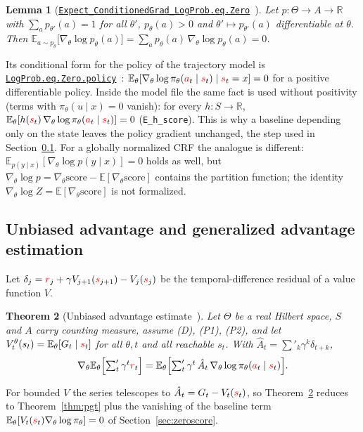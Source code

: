 \documentclass[11pt,a4paper]{article}
\newcommand{\lmod}[2]{\href{http://www.lemma.cn/lean/?module=#2}{\nolinkurl{#1}}}
\newtheorem{theorem}{Theorem}[section]
\newtheorem{lemma}[theorem]{Lemma}
\newcommand{\R}{\mathbb{R}}
\newcommand{\E}{\mathbb{E}}
\newcommand{\rv}[1]{{\color{red}#1}}       %
\newcommand{\sv}{\rv{s}}
\newcommand{\av}{\rv{a}}
\newcommand{\rw}{\rv{r}}
\newcommand{\grad}{\nabla_{\theta}}
\newcommand{\tsum}{\textstyle\sum'}
\begin{document}
\begin{lemma}[\lmod{Expect_ConditionedGrad_LogProb.eq.Zero}{Random.ExpectConditionedGrad_LogProb.eq.Zero}~\cite{lemma_zero}]
\label{lem:zero}
Let $p:\Theta\to A\to\R$ with $\sum_ap_{\theta'}(a)=1$ for all $\theta'$, $p_\theta(a)>0$ and $\theta'\mapsto p_{\theta'}(a)$ differentiable at $\theta$.
Then $\displaystyle\E_{a\sim p_\theta}\bigl[\grad\log p_\theta(a)\bigr]=\sum_ap_\theta(a)\,\grad\log p_\theta(a)=0$.
\end{lemma}
Its conditional form for the policy of the trajectory model is \lmod{LogProb.eq.Zero.policy}{Random.ExpectConditionedGrad_LogProb.eq.Zero#policy}~\cite{lemma_score}: $\E_\theta[\grad\log\pi_\theta(\av_t\mid\sv_t)\mid\sv_t=x]=0$ for a positive differentiable policy.
Inside the model file the same fact is used without positivity (terms with $\pi_\theta(u\mid x)=0$ vanish): for every $h:S\to\R$, $\E_\theta[h(\sv_t)\,\grad\log\pi_\theta(\av_t\mid\sv_t)]=0$ (\texttt{E\_h\_score}).
This is why a baseline depending only on the state leaves the policy gradient unchanged, the step used in Section~\ref{sec:gae}.
For a globally normalized CRF the analogue is different: $\E_{p(y\mid x)}[\grad\log p(y\mid x)]=0$ holds as well, but $\grad\log p=\grad\mathrm{score}-\E[\grad\mathrm{score}]$ contains the partition function; the identity $\grad\log Z=\E[\grad\mathrm{score}]$ is not formalized.


\subsection{Unbiased advantage and generalized advantage estimation}
\label{sec:gae}

Let $\delta_j=\rw_j+\gamma V_{j+1}(\sv_{j+1})-V_j(\sv_j)$ be the temporal-difference residual of a value function $V$.

\begin{theorem}[Unbiased advantage estimate~\cite{lemma_uae}]
\label{thm:main}
Let $\Theta$ be a real Hilbert space, $S$ and $A$ carry counting measure, assume (D), (P1), (P2), and let $V^\theta_t(s_t)=\E_\theta[G_t\mid\sv_t]$ for all $\theta,t$ and all reachable $s_t$.
With $\hat A_t=\tsum_k\gamma^k\delta_{t+k}$,
\[
\grad\E_\theta\Bigl[\tsum_t\gamma^t\rw_t\Bigr]=\E_\theta\Bigl[\tsum_t\gamma^t\,\hat A_t\,\grad\log\pi_\theta(\av_t\mid\sv_t)\Bigr].
\]
\end{theorem}
For bounded $V$ the series telescopes to $\hat A_t=G_t-V_t(\sv_t)$, so Theorem~\ref{thm:main} reduces to Theorem~\ref{thm:pgt} plus the vanishing of the baseline term $\E_\theta[V_t(\sv_t)\grad\log\pi_\theta]=0$ of Section~\ref{sec:zeroscore}.
\end{document}
